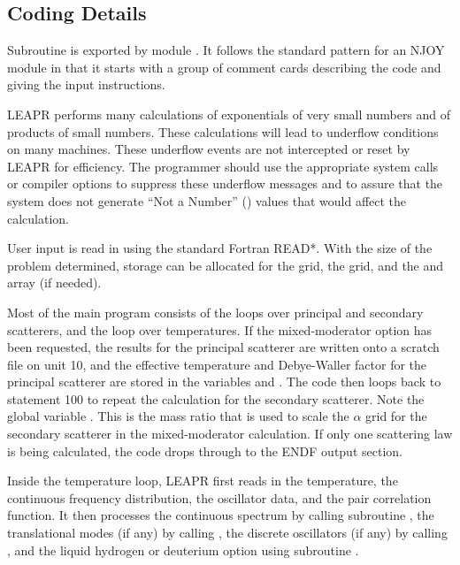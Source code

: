 \subsection{Coding Details}
\label{ssLEAPR_details}

Subroutine  is exported by
module .  
It follows the standard pattern for an NJOY module in that it
starts with a group of comment cards describing the code and giving
the input instructions.

LEAPR performs many calculations of exponentials
of very small numbers and of products of small numbers.  These
calculations will lead to underflow conditions on many machines.
These underflow events are not intercepted or reset by LEAPR
for efficiency.  The programmer should use the appropriate
system calls or compiler options to suppress these underflow
messages and to assure that the system does not generate
``Not a Number'' () values that would affect the
calculation.

User input is read in using the standard Fortran READ*. With the
size of the problem determined, storage can be allocated for the
 grid, the  grid, and the  and
 array (if needed).

Most of the main program consists of the loops over principal and
secondary scatterers, and the loop over temperatures.  If the
mixed-moderator option has been requested, the results for the
principal scatterer are written onto a scratch file on unit 10, and the
effective temperature and Debye-Waller factor for the principal
scatterer are stored in the variables  and .
The code then loops back to statement 100 to repeat the calculation for
the secondary scatterer.  Note the global variable .
This is the mass ratio that is used to scale the $\alpha$ grid for
the secondary scatterer in the mixed-moderator calculation.  If only
one scattering law is being calculated, the code drops through to
the ENDF output section.

Inside the temperature loop, LEAPR first reads in the temperature,
the continuous frequency distribution, the oscillator data, and
the pair correlation function.  It then processes the continuous
spectrum by calling subroutine ,
the translational modes (if any) by calling
, the discrete
oscillators (if any) by calling
, and the liquid
hydrogen or deuterium option using subroutine
.

